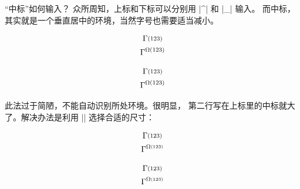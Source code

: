 \begin{myQA}{“中标”如何输入？}
众所周知，上标和下标可以分别用 \code|^| 和 \code|_| 输入。
而中标，其实就是一个垂直居中的环境，当然字号也需要适当减小。

{
\newcommand{\midscript}[1]{\vcenter{\hbox{$\scriptstyle #1$}}}

\begin{myExampleH}[0.25]
{\begin{gather*}
	\Gamma\midscript{(123)} \\
	\Gamma^{\Omega\midscript{(123)}}
\end{gather*}}
\newcommand{\midscript}[1]{
    \vcenter{\hbox{$\scriptstyle #1$}}}

\begin{gather*}
    \Gamma\midscript{(123)} \\
    \Gamma^{\Omega\midscript{(123)}}
\end{gather*}
\end{myExampleH}
}

此法过于简陋，不能自动识别所处环境。很明显，
第二行写在上标里的中标就大了。解决办法是利用
\code|\mathchoice| 
选择合适的尺寸：

{
\newcommand\midscript[1]{\mathchoice
    {\vcenter{\hbox{$\scriptstyle #1$}}}
    {\vcenter{\hbox{$\scriptstyle #1$}}}
    {\vcenter{\hbox{$\scriptscriptstyle #1$}}}
    {\vcenter{\hbox{$\scriptscriptstyle #1$}}}}

\begin{myExampleH}[0.25]
{\begin{gather*}
	\Gamma\midscript{(123)} \\
	\Gamma^{\Omega\midscript{(123)}}
\end{gather*}}
\newcommand\midscript[1]{\mathchoice
    {\vcenter{\hbox{$\scriptstyle #1$}}}
    {\vcenter{\hbox{$\scriptstyle #1$}}}
    {\vcenter{\hbox{$\scriptscriptstyle #1$}}}
    {\vcenter{\hbox{$\scriptscriptstyle #1$}}}
}

\begin{gather*}
    \Gamma\midscript{(123)} \\
    \Gamma^{\Omega\midscript{(123)}}
\end{gather*}
\end{myExampleH}
}

\end{myQA}